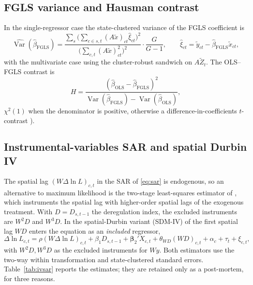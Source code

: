 \subsection{FGLS variance and Hausman contrast}
\label{app:fgls}
In the single-regressor case the state-clustered variance of the FGLS coefficient
is
\begin{equation}
  \widehat{\operatorname{Var}}(\hat\beta_{\text{FGLS}})=
  \frac{\sum_s\big(\sum_{c\in s,t}(A\tilde x)_{ct}\hat\xi_{ct}\big)^2}
  {\big(\sum_{c,t}(A\tilde x)_{ct}^2\big)^2}\cdot\frac{G}{G-1},
  \qquad \hat\xi_{ct}=\tilde y_{ct}-\hat\beta_{\text{FGLS}}\tilde x_{ct},
\end{equation}
with the multivariate case using the cluster-robust sandwich on $A\tilde Z_t$. The
OLS--FGLS contrast is
\begin{equation}
  H=\frac{(\hat\beta_{\text{OLS}}-\hat\beta_{\text{FGLS}})^2}
  {\operatorname{Var}(\hat\beta_{\text{FGLS}})-\operatorname{Var}(\hat\beta_{\text{OLS}})},
\end{equation}
$\chi^2(1)$ when the denominator is positive, otherwise a difference-in-coefficients
$t$-contrast \citep{greene2003, hausman1978}).

\subsection{Instrumental-variables SAR and spatial Durbin IV}
\label{app:ivsar}
The spatial lag $(W\Delta\ln L)_{c,t}$ in the SAR of \eqref{eq:sar} is endogenous,
so an alternative to maximum likelihood is the two-stage least-squares estimator of
\citet{kelejian1998}, which instruments the spatial lag with higher-order spatial
lags of the exogenous treatment. With $D=D_{s,t-1}$ the deregulation index, the
excluded instruments are $W^2D$ and $W^3D$. In the spatial-Durbin variant (SDM-IV)
of \citet{lesage2009} the first spatial lag $WD$ enters the equation as an
\emph{included} regressor,
\begin{equation}
  \Delta\ln L_{c,t}=\rho(W\Delta\ln L)_{c,t}+\beta_1 D_{s,t-1}
  +\bm\beta_2'X_{c,t}+\theta_{WD}(WD)_{c,t}+\alpha_c+\tau_t+\xi_{c,t},
  \label{eq:sdmiv}
\end{equation}
with $W^2D,W^3D$ as the excluded instruments for $Wy$. Both estimators use the
two-way within transformation and state-clustered standard errors.
Table~\ref{tab:ivsar} reports the estimates; they are retained only as a
post-mortem, for three reasons.
 
